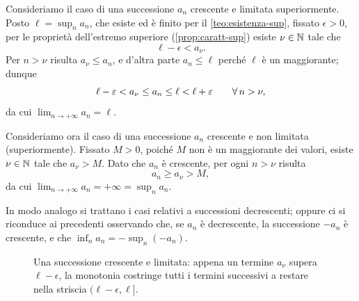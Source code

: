 \begin{dimostrazione}
Consideriamo il caso di una successione $a_{n}$ crescente e limitata superiormente.
Posto $\ell=\sup_{n}a_{n}$, che esiste ed è finito per il \cref{teo:esistenza-sup},
fissato $\epsilon>0$, per le proprietà dell'estremo superiore
(\cref{prop:caratt-sup}) esiste $\nu\in\mathbb{N}$ tale che
\begin{equation}\label{eq:monotone-passo1}
  \ell-\epsilon<a_{\nu}.
\end{equation}
Per $n>\nu$ risulta $a_{\nu}\le a_{n}$, e d'altra parte $a_{n}\le\ell$ perché $\ell$ è un
maggiorante; dunque
\begin{equation}\label{eq:monotone-passo2}
  \ell-\varepsilon<a_{\nu}\le a_{n}\le\ell<\ell+\varepsilon \qquad\forall\, n>\nu,
\end{equation}
da cui $\lim_{n\to+\infty}a_{n}=\ell$.

Consideriamo ora il caso di una successione $a_{n}$ crescente e non limitata
(superiormente). Fissato $M>0$, poiché $M$ non è un maggiorante dei valori, esiste
$\nu\in\mathbb{N}$ tale che $a_{\nu}>M$. Dato che $a_{n}$ è crescente, per ogni $n>\nu$ risulta
\begin{equation}\label{eq:monotone-passo3}
  a_{n}\ge a_{\nu}>M,
\end{equation}
da cui $\lim_{n\to+\infty}a_{n}=+\infty=\sup_{n}a_{n}$.

In modo analogo si trattano i casi relativi a successioni decrescenti; oppure ci si
riconduce ai precedenti osservando che, se $a_{n}$ è decrescente, la successione $-a_{n}$
è crescente, e che $\inf_{n}a_{n}=-\sup_{n}(-a_{n})$.
\end{dimostrazione}

\begin{figure}[htb]
\centering
{}
\caption{Una successione crescente e limitata: appena un termine $a_{\nu}$ supera
$\ell-\epsilon$, la monotonia costringe tutti i termini successivi a restare nella
striscia $(\ell-\epsilon,\ell]$.}
\label{fig:monotona-sup}
\end{figure}

